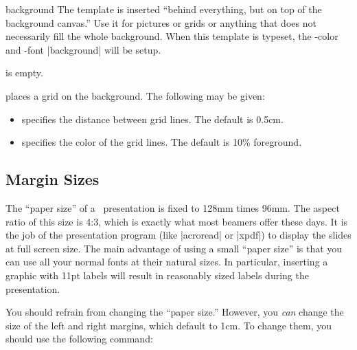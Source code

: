 \begin{element}{background}\yes\yes\yes
  The template is inserted ``behind everything, but on top of the
  background canvas.'' Use it for pictures or grids or anything that
  does not necessarily fill the whole background. When this template
  is typeset, the \beamer-color and -font |background| will be
  setup.

  \begin{templateoptions}
     is empty.

    places a grid on the background. The following
     may be given:
    \begin{itemize}
    \item {} specifies the distance
      between grid lines. The default is 0.5cm.
    \item {} specifies the color of the
      grid lines. The default is 10\% foreground.
    \end{itemize}
  \end{templateoptions}
\end{element}




\subsection{Margin Sizes}

The ``paper size'' of a \beamer\ presentation is fixed to 128mm times
96mm. The aspect ratio of this size is 4:3, which is exactly what most
beamers offer these days. It is the job of the
presentation program (like |acroread| or |xpdf|) to display the slides
at full screen size. The main advantage of using a small ``paper size''
is that you can use all your normal fonts at their natural sizes. In
particular, inserting a graphic with 11pt labels will result in
reasonably sized labels during the presentation.

You should refrain from changing the ``paper size.'' However, you
\emph{can} change the size of the left and right margins, which
default to 1cm. To change them, you should use the following
command:

